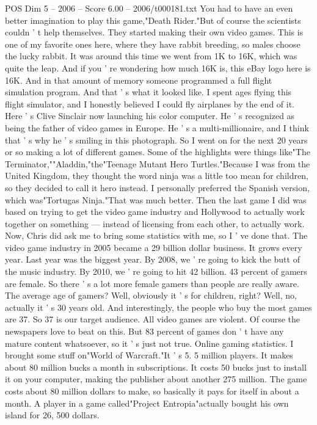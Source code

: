 \begin{textsample}{POS Dim 5 – 2006 – Score 6.00 – 2006/t000181.txt}
You had to have an even better imagination to play this game,"Death Rider."But of course the scientists couldn ' t help themselves.
They started making their own video games.
This is one of my favorite ones here, where they have rabbit breeding, so males choose the lucky rabbit.
It was around this time we went from 1K to 16K, which was quite the leap.
And if you ' re wondering how much 16K is, this eBay logo here is 16K.
And in that amount of memory someone programmed a full flight simulation program.
And that ' s what it looked like.
I spent ages flying this flight simulator, and I honestly believed I could fly airplanes by the end of it.
Here ' s Clive Sinclair now launching his color computer.
He ' s recognized as being the father of video games in Europe.
He ' s a multi-millionaire, and I think that ' s why he ' s smiling in this photograph.
So I went on for the next 20 years or so making a lot of different games.
Some of the highlights were things like"The Terminator,""Aladdin,"the"Teenage Mutant Hero Turtles."Because I was from the United Kingdom, they thought the word ninja was a little too mean for children, so they decided to call it hero instead.
I personally preferred the Spanish version, which was"Tortugas Ninja."That was much better.
Then the last game I did was based on trying to get the video game industry and Hollywood to actually work together on something — instead of licensing from each other, to actually work.
Now, Chris did ask me to bring some statistics with me, so I ' ve done that.
The video game industry in 2005 became a 29 billion dollar business.
It grows every year.
Last year was the biggest year.
By 2008, we ' re going to kick the butt of the music industry.
By 2010, we ' re going to hit 42 billion. 43 percent of gamers are female.
So there ' s a lot more female gamers than people are really aware.
The average age of gamers?
Well, obviously it ' s for children, right?
Well, no, actually it ' s 30 years old.
And interestingly, the people who buy the most games are 37.
So 37 is our target audience.
All video games are violent.
Of course the newspapers love to beat on this.
But 83 percent of games don ' t have any mature content whatsoever, so it ' s just not true.
Online gaming statistics.
I brought some stuff on"World of Warcraft."It ' s 5. 5 million players.
It makes about 80 million bucks a month in subscriptions.
It costs 50 bucks just to install it on your computer, making the publisher about another 275 million.
The game costs about 80 million dollars to make, so basically it pays for itself in about a month.
A player in a game called"Project Entropia"actually bought his own island for 26, 500 dollars.

\end{textsample}
